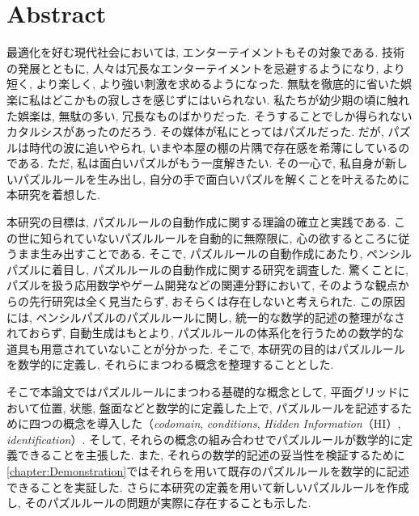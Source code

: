 \chapter*{{\rm \bf Abstract}}\label{chapter:Abstract}
最適化を好む現代社会においては, エンターテイメントもその対象である. 技術の発展とともに, 人々は冗長なエンターテイメントを忌避するようになり, より短く, より楽しく, より強い刺激を求めるようになった. 無駄を徹底的に省いた娯楽に私はどこかもの寂しさを感じずにはいられない. 私たちが幼少期の頃に触れた娯楽は, 無駄の多い, 冗長なものばかりだった. そうすることでしか得られないカタルシスがあったのだろう. その媒体が私にとってはパズルだった. だが, パズルは時代の波に追いやられ, いまや本屋の棚の片隅で存在感を希薄にしているのである. ただ, 私は面白いパズルがもう一度解きたい. その一心で, 私自身が新しいパズルルールを生み出し, 自分の手で面白いパズルを解くことを叶えるために本研究を着想した.


本研究の目標は, パズルルールの自動作成に関する理論の確立と実践である. この世に知られていないパズルルールを自動的に無際限に, 心の欲するところに従うまま生み出すことである. そこで, パズルルールの自動作成にあたり, ペンシルパズルに着目し, パズルルールの自動作成に関する研究を調査した. 驚くことに, パズルを扱う応用数学やゲーム開発などの関連分野において, そのような観点からの先行研究は全く見当たらず, おそらくは存在しないと考えられた. この原因には, ペンシルパズルのパズルルールに関し, 統一的な数学的記述の整理がなされておらず, 自動生成はもとより, パズルルールの体系化を行うための数学的な道具も用意されていないことが分かった. そこで, 本研究の目的はパズルルールを数学的に定義し, それらにまつわる概念を整理することとした.

そこで本論文ではパズルルールにまつわる基礎的な概念として, 平面グリッドにおいて位置, 状態, 盤面などと数学的に定義した上で, パズルルールを記述するために四つの概念を導入した（\textit{codomain}, \textit{conditions}, \textit{Hidden Information}（HI）, \textit{identification}）. そして, それらの概念の組み合わせでパズルルールが数学的に定義できることを主張した. また, それらの数学的記述の妥当性を検証するために\cref{chapter:Demonstration}ではそれらを用いて既存のパズルルールを数学的に記述できることを実証した. さらに本研究の定義を用いて新しいパズルルールを作成し, そのパズルルールの問題が実際に存在することも示した.


